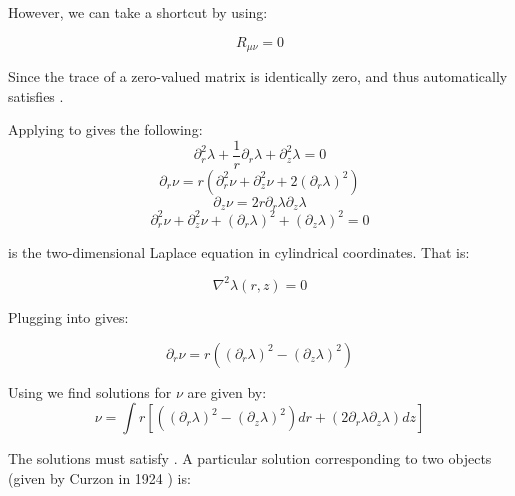 \documentclass{article}
\begin{document}
However, we can take a shortcut by using:

\begin{equation}
R_{\mu\nu}=0
\label{eq:vacuum-solutions}
\end{equation}

Since the trace of a zero-valued matrix is identically zero, and thus  automatically satisfies .

Applying  to  gives the following:
\begin{equation}
\partial^{2}_{r}\lambda+\frac{1}{r}\partial_{r}\lambda+\partial^{2}_{z}\lambda=0\label{eq:laplace}
\end{equation}
\begin{equation}
\partial_{r}\nu=r\left(\partial^{2}_{r}\nu+\partial^{2}_{z}\nu+2\left(\partial_{r}\lambda\right)^{2}\right)\label{eq:R_rr=0}
\end{equation}
\begin{equation}
\partial_{z}\nu=2r\partial_{r}\lambda\partial_{z}\lambda\label{eq:nu_z}
\end{equation}
\begin{equation}
\partial^{2}_{r}\nu+\partial^{2}_{z}\nu+\left(\partial_{r}\lambda\right)^{2}+\left(\partial_{z}\lambda\right)^{2}=0\label{eq:R_phiphi=0}
\end{equation}

 is the two-dimensional Laplace equation in cylindrical coordinates. That is:

\begin{equation}
\nabla^2\lambda(r,z)=0
\label{eq:laplace-r-z}
\end{equation}

Plugging  into  gives:

\begin{equation}
\partial_{r}\nu=r\left(\left(\partial_{r}\lambda\right)^{2}-\left(\partial_{z}\lambda\right)^{2}\right)\label{eq:nu_r}
\end{equation}

Using  we find solutions for $\nu$ are given by:
\begin{equation}
\nu=\int r[\left(\left(\partial_{r}\lambda\right)^{2}-\left(\partial_{z}\lambda\right)^{2}\right)dr+\left(2\partial_{r}\lambda\partial_{z}\lambda\right)dz]\label{eq:nu}
\end{equation}

The solutions must satisfy . A particular solution corresponding to two objects (given by Curzon in 1924 \cite{curzon1924} ) is:
\end{document}
